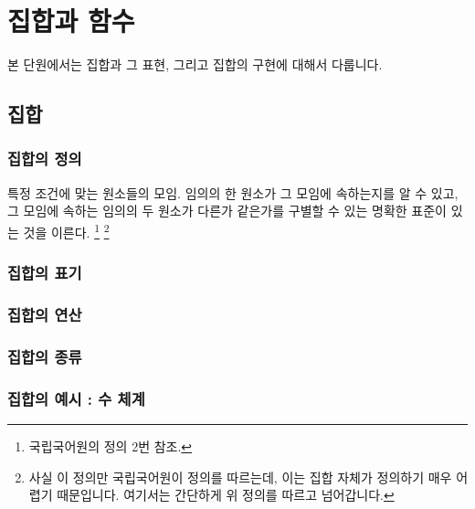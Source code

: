 \chapter{집합과 함수}

본 단원에서는 집합과 그 표현, 그리고 집합의 구현에 대해서 다룹니다. 

\section{집합} 

\subsection{집합의 정의}

\begin{define}[집합]
특정 조건에 맞는 원소들의 모임. 임의의 한 원소가 그 모임에 속하는지를 알 수 있고, 그 모임에 속하는 임의의 두 원소가 다른가 같은가를 구별할 수 있는 명확한 표준이 있는 것을 이른다. \footnote{국립국어원의 정의 2번 참조.} \footnote{사실 이 정의만 국립국어원이 정의를 따르는데, 이는 집합 자체가 정의하기 매우 어렵기 때문입니다. 여기서는 간단하게 위 정의를 따르고 넘어갑니다.} 
\end{define}




\subsection{집합의 표기} 

\subsection{집합의 연산} 

\subsection{집합의 종류} 

\subsection{집합의 예시 : 수 체계}

